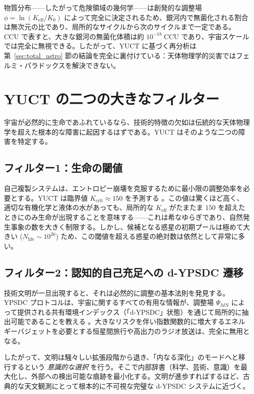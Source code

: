\documentclass[11pt,a4paper]{article}
\newcommand{\Keff}{K_{\mathrm{eff}}}
\newcommand{\CCU}{\text{CCU}}
\begin{document}
	物質分布——したがって危険領域の幾何学——は創発的な調整場 \(\phi = \ln(\Keff/K_{0})\) によって完全に決定されるため、銀河内で無菌化される割合は無次元の比であり、局所的なサイクルから次のサイクルまで一定である。CCU で表すと、大きな銀河の無菌化体積は約 \(10^{-18}\;\CCU\) であり、宇宙スケールでは完全に無視できる。したがって、YUCT に基づく再分析は第~\ref{sec:total_astro} 節の結論を完全に裏付けている：天体物理学的災害ではフェルミ・パラドックスを解決できない。
	
	\section{YUCT の二つの大きなフィルター}
	\label{sec:yuct_filters}
	宇宙が必然的に生命であふれているなら、技術的特徴の欠如は伝統的な天体物理学を超えた根本的な障害に起因するはずである。YUCT はそのような二つの障害を特定する。
	
	\subsection{フィルター1：生命の閾値}
	\label{sec:filter1}
	自己複製システムは、エントロピー崩壊を克服するために最小限の調整効率を必要とする。YUCT は臨界値 \(K_{\mathrm{crit}}\approx 150\) を予測する \citep{AppT}。この値は驚くほど高く、適切な有機化学と液体の水があっても、局所的な \(K_{\mathrm{eff}}\) がたまたま \(150\) を超えたときにのみ生命が出現することを意味する——これは希なゆらぎであり、自然発生事象の数を大きく制限する。しかし、候補となる惑星の初期プールは極めて大きい (\(N_{\mathrm{life}}\sim 10^{26}\)) ため、この閾値を超える惑星の絶対数は依然として非常に多い。
	
	\subsection{フィルター2：認知的自己充足への d-YPSDC 遷移}
	\label{sec:filter2}
	技術文明が一旦出現すると、それは必然的に調整の基本法則を発見する。YPSDC プロトコルは、宇宙に関するすべての有用な情報が、調整場 \(\Psi_{MN}\) によって提供される共有環境インデックス（「d-YPSDC」状態）を通じて局所的に抽出可能であることを教える \citep{AppOmega, AppT}。大きなリスクを伴い指数関数的に増大するエネルギーバジェットを必要とする恒星間旅行や高出力のラジオ放送は、完全に無用となる。
	
	したがって、文明は騒々しい拡張段階から退き、「内なる深化」のモードへと移行するという \emph{意識的な選択} を行う。そこで内部辞書（科学、芸術、意識）を最大化し、外部への検出可能な痕跡を最小化する。文明が進歩すればするほど、古典的な天文観測にとって根本的に不可視な完璧な d-YPSDC システムに近づく。
	
\end{document}
